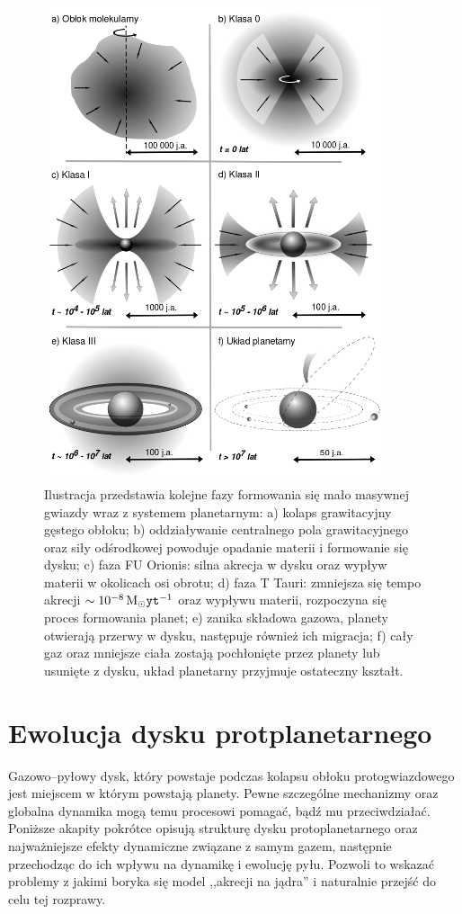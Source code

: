 \begin{figure}[p]
\centering 
\includegraphics[width=0.9\textwidth]{figures/planetformation.png}
\caption{Ilustracja przedstawia kolejne fazy formowania się mało masywnej gwiazdy
   wraz z systemem planetarnym: a) kolaps grawitacyjny gęstego obłoku; b)
   oddziaływanie centralnego pola grawitacyjnego oraz siły odśrodkowej powoduje
   opadanie materii i formowanie się dysku; c) faza FU Orionis: silna akrecja w
   dysku oraz wypływ materii w okolicach osi obrotu; d) faza T Tauri: zmniejsza
   się tempo akrecji $\sim 10^{-8}\hbox{$\mathrm{\thinspace M_{\odot}}$}{\texttt{yt}}^{-1}$ oraz wypływu materii,
   rozpoczyna się proces formowania planet; e) zanika składowa gazowa, planety
otwierają przerwy w dysku, następuje również ich migracja; f) cały gaz oraz
mniejsze ciała zostają pochłonięte przez planety lub usunięte z dysku, układ
planetarny przyjmuje ostateczny kształt.}

\label{fig:planet}
\end{figure}

\section{Ewolucja dysku protplanetarnego}
Gazowo--pyłowy dysk, który powstaje podczas kolapsu obłoku protogwiazdowego jest
miejscem w którym powstają planety. Pewne szczególne mechanizmy oraz globalna
dynamika mogą temu procesowi pomagać, bądź mu przeciwdziałać. Poniższe akapity
pokrótce opisują strukturę dysku protoplanetarnego oraz najważniejsze efekty
dynamiczne związane z samym gazem, następnie przechodząc do ich wpływu na
dynamikę i ewolucję pyłu. Pozwoli to wskazać problemy z jakimi boryka się model
,,akrecji na jądra'' i naturalnie przejść do celu tej rozprawy.

